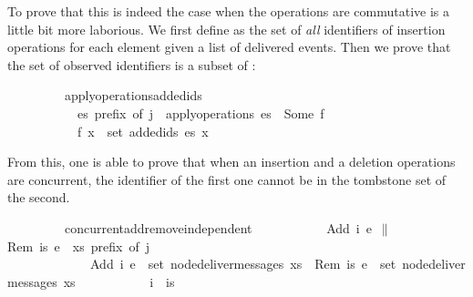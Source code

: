 \noindent To prove that this is indeed the case when the operations are
commutative is a little bit more laborious. We first define  as
the set of \emph{all} identifiers of insertion operations for each element
given a list of delivered events.  Then we prove that the set of observed
identifiers is a subset of :

\vspace{0.35em}
\begin{isabellebody}
\ \ \ \ \ \ \ \ \ apply{\isacharunderscore}operations{\isacharunderscore}added{\isacharunderscore}ids{\isacharcolon}\isanewline
\ \ \ \ \ \ \ \ \ \ \ {\isachardoublequoteopen}es\ prefix\ of\ j{\isachardoublequoteclose}\ \ {\isachardoublequoteopen}apply{\isacharunderscore}operations\ es\ {\isacharequal}\ Some\ f{\isachardoublequoteclose}\isanewline
\ \ \ \ \ \ \ \ \ \ \ {\isachardoublequoteopen}f\ x\ {\isasymsubseteq}\ set\ {\isacharparenleft}added{\isacharunderscore}ids\ es\ x{\isacharparenright}{\isachardoublequoteclose}
\end{isabellebody}
\vspace{0.35em}

\noindent From this, one is able to prove that when an insertion and a deletion
operations are concurrent, the identifier of the first one cannot be
in the tombstone set of the second.

\vspace{0.35em}
\begin{isabellebody}
\ \ \ \ \ \ \ \ \ concurrent{\isacharunderscore}add{\isacharunderscore}remove{\isacharunderscore}independent{\isacharcolon}\isanewline
\ \ \ \ \ \ \ \ \ \ \ {\isachardoublequoteopen}{\isacharparenleft}Add\ i\ e{}{\isacharparenright}\ $\|$ {\isacharparenleft}Rem\ is\ e{}{\isacharparenright}{\isachardoublequoteclose}\ \ {\isachardoublequoteopen}xs\ prefix\ of\ j{\isachardoublequoteclose}\isanewline
\ \ \ \ \ \ \ \ \ \ \ \ \ {\isachardoublequoteopen}Add\ i\ e{}\ {\isasymin}\ set\ {\isacharparenleft}node{\isacharunderscore}deliver{\isacharunderscore}messages\ xs{\isacharparenright}{\isachardoublequoteclose}\ \ {\isachardoublequoteopen}Rem\ is\ e{}\ {\isasymin}\ set\ {\isacharparenleft}node{\isacharunderscore}deliver{\isacharunderscore}messages\ xs{\isacharparenright}{\isachardoublequoteclose}\isanewline
\ \ \ \ \ \ \ \ \ \ \ {\isachardoublequoteopen}i\ {\isasymnotin}\ is{\isachardoublequoteclose}
\end{isabellebody}
\vspace{0.35em}

